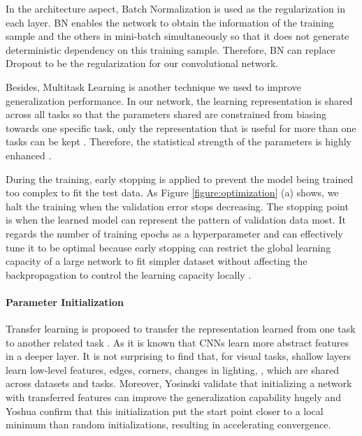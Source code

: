 \documentclass[a4paper,12pt]{article}
\begin{document}
In the architecture aspect, Batch Normalization \cite{DBLP:journals/corr/IoffeS15} is used as the regularization in each layer. BN enables the network to obtain the information of the training sample and the others in mini-batch simultaneously so that it does not generate deterministic dependency on this training sample. Therefore, BN can replace Dropout \cite{JMLR:v15:srivastava14a} to be the regularization for our convolutional network. 

Besides, Multitask Learning is another technique we used to improve generalization performance. In our network, the learning representation is shared across all tasks so that the parameters shared are constrained from biasing towards one specific task, \ie only the representation that is useful for more than one tasks can be kept \cite{Goodfellow-et-al-2016}.  Therefore, the statistical strength of the parameters is highly enhanced \cite{Baxter:1995:LIR:225298.225336}.

During the training, early stopping is applied to prevent the model being trained too complex to fit the test data. As Figure \ref{figure:optimization} (a) shows, we halt the training when the validation error stops decreasing.  The stopping point is when the learned model can represent the pattern of validation data most. It regards the number of training epochs as a hyperparameter and can effectively tune it to be optimal \cite{DBLP:journals/corr/abs-1206-5533}  because early stopping can restrict the global learning capacity of a large network to fit simpler dataset without affecting the backpropagation to control the learning capacity locally \cite{Caruana:2000:ONN:3008751.3008807}.



\paragraph{Parameter Initialization}

Transfer learning is proposed to transfer the representation learned from one task to another related task \cite{Pan:2010:STL:1850483.1850545}. As it is known that CNNs learn more abstract features in a deeper layer. It is not surprising to find that, for visual tasks, shallow layers learn low-level features, \eg edges, corners, changes in lighting, \etc, which are shared across datasets and tasks. Moreover, Yosinski \etal validate \cite{DBLP:journals/corr/YosinskiCBL14} that initializing a network with transferred features can improve the generalization capability hugely and Yoshua \etal \cite{NIPS2006_3048} confirm that this initialization put the start point closer to a local minimum than random initializations, resulting in accelerating convergence.
\end{document}
